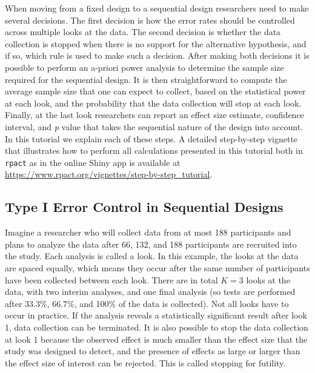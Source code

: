 \documentclass[
  english,
  ,man,floatsintext]{apa6}
\begin{document}
When moving from a fixed design to a sequential design researchers need to make several decisions. The first decision is how the error rates should be controlled across multiple looks at the data. The second decision is whether the data collection is stopped when there is no support for the alternative hypothesis, and if so, which rule is used to make such a decision. After making both decisions it is possible to perform an a-priori power analysis to determine the sample size required for the sequential design. It is then straightforward to compute the average sample size that one can expect to collect, based on the statistical power at each look, and the probability that the data collection will stop at each look. Finally, at the last look researchers can report an effect size estimate, confidence interval, and \emph{p} value that takes the sequential nature of the design into account. In this tutorial we explain each of these steps. A detailed step-by-step vignette that illustrates how to perform all calculations presented in this tutorial both in \texttt{rpact} as in the online Shiny app is available at \url{https://www.rpact.org/vignettes/step-by-step_tutorial}.

\hypertarget{type-i-error-control-in-sequential-designs}{%
\subsection{Type I Error Control in Sequential Designs}\label{type-i-error-control-in-sequential-designs}}

Imagine a researcher who will collect data from at most 188 participants and plans to analyze the data after 66, 132, and 188 participants are recruited into the study. Each analysis is called a look. In this example, the looks at the data are spaced equally, which means they occur after the same number of participants have been collected between each look. There are in total \(K = 3\) looks at the data, with two interim analyses, and one final analysis (so tests are performed after 33.3\%, 66.7\%, and 100\% of the data is collected). Not all looks have to occur in practice. If the analysis reveals a statistically significant result after look 1, data collection can be terminated. It is also possible to stop the data collection at look 1 because the observed effect is much smaller than the effect size that the study was designed to detect, and the presence of effects as large or larger than the effect size of interest can be rejected. This is called stopping for futility.
\end{document}
